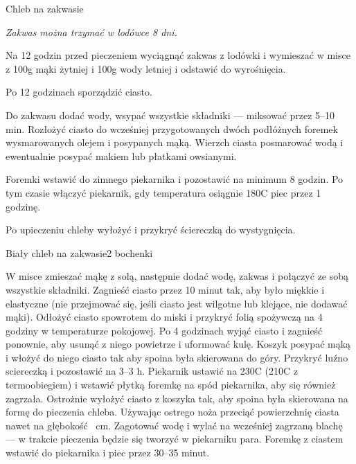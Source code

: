 \documentclass[a4paper,12pt]{article}
\begin{document}
\newpage
\begin{recipe}{Chleb na zakwasie}{}{}
\freeform%
\begin{center}
\textit{Zakwas można trzymać w lodówce 8 dni.}
\end{center}


Na 12 godzin przed pieczeniem wyciągnąć zakwas z lodówki i wymieszać w misce z 100g mąki żytniej i 100g wody letniej i odstawić do wyrośnięcia.

\freeform%
Po 12 godzinach sporządzić ciasto.

Do zakwasu dodać wody, wsypać wszystkie składniki --- miksować przez 5--10 min.
Rozłożyć ciasto do wcześniej przygotowanych dwóch podłóżnych foremek wysmarowanych olejem i posypanych mąką. Wierzch ciasta posmarować wodą i
ewentualnie posypać makiem lub płatkami owsianymi.

Foremki wstawić do zimnego piekarnika i pozostawić na minimum 8 godzin. Po tym czasie włączyć piekarnik, gdy temperatura osiągnie 180\0C piec przez 1 godzinę.

Po upieczeniu chleby wyłożyć i przykryć ściereczką do wystygnięcia.

\end{recipe}
\newpage

\begin{recipe}{Biały chleb na zakwasie}{2 bochenki}{}

W misce zmieszać mąkę z solą, następnie dodać wodę, zakwas i połączyć ze sobą
wszystkie składniki. Zagnieść ciasto przez 10 minut tak, aby było miękkie i
elastyczne (nie przejmować się, jeśli ciasto jest wilgotne lub klejące, nie
dodawać mąki).  
\freeform%
Odłożyć ciasto spowrotem do miski i przykryć folią spożywczą na
4 godziny w temperaturze pokojowej. Po 4 godzinach wyjąć ciasto i zagnieść
ponownie, aby usunąć z niego powietrze i uformować kulę.
Koszyk posypać mąką i włożyć do niego ciasto tak aby spoina była skierowana do
góry. Przykryć luźno sciereczką i pozostawić na 3--3 h. Piekarnik
ustawić na 230\0C (210\0C z termoobiegiem) i wstawić płytką foremkę
na spód piekarnika, aby się również zagrzała. Ostrożnie wyłożyć
ciasto z koszyka tak, aby spoina była skierowana na formę do pieczenia chleba. Używając ostrego
noża przeciąć powierzchnię ciasta nawet na głębokość  cm. Zagotować
wodę i wylać na wcześniej zagrzaną blachę --- w trakcie pieczenia
będzie się tworzyć w piekarniku para. Foremkę z ciastem wstawić do piekarnika i
piec przez 30--35 minut.

\end{recipe}
\end{document}
